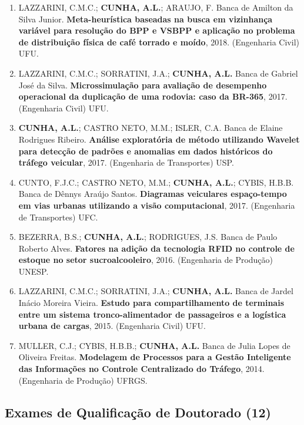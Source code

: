 \documentclass[
  brazilian,
  11pt,
  a4paper,
]{article}
\begin{document}
\begin{enumerate}
  Mariana Marçal Thebit. \textbf{Reconstrução de matriz O/D sintética a
  partir de dados de tráfego disponíveis na web}, 2018. (Engenharia de
  Transportes) USP.
\item
  LAZZARINI, C.M.C.; \textbf{CUNHA, A.L.}; ARAUJO, F. Banca de Amilton
  da Silva Junior. \textbf{Meta-heurística baseadas na busca em
  vizinhança variável para resolução do BPP e VSBPP e aplicação no
  problema de distribuição física de café torrado e moído}, 2018.
  (Engenharia Civil) UFU.
\item
  LAZZARINI, C.M.C.; SORRATINI, J.A.; \textbf{CUNHA, A.L.} Banca de
  Gabriel José da Silva. \textbf{Microssimulação para avaliação de
  desempenho operacional da duplicação de uma rodovia: caso da BR-365},
  2017. (Engenharia Civil) UFU.
\item
  \textbf{CUNHA, A.L.}; CASTRO NETO, M.M.; ISLER, C.A. Banca de Elaine
  Rodrigues Ribeiro. \textbf{Análise exploratória de método utilizando
  Wavelet para detecção de padrões e anomalias em dados históricos do
  tráfego veicular}, 2017. (Engenharia de Transportes) USP.
\item
  CUNTO, F.J.C.; CASTRO NETO, M.M.; \textbf{CUNHA, A.L.}; CYBIS, H.B.B.
  Banca de Dênnys Araújo Santos. \textbf{Diagramas veiculares
  espaço-tempo em vias urbanas utilizando a visão computacional}, 2017.
  (Engenharia de Transportes) UFC.
\item
  BEZERRA, B.S.; \textbf{CUNHA, A.L.}; RODRIGUES, J.S. Banca de Paulo
  Roberto Alves. \textbf{Fatores na adição da tecnologia RFID no
  controle de estoque no setor sucroalcooleiro}, 2016. (Engenharia de
  Produção) UNESP.
\item
  LAZZARINI, C.M.C.; SORRATINI, J.A.; \textbf{CUNHA, A.L.} Banca de
  Jardel Inácio Moreira Vieira. \textbf{Estudo para compartilhamento de
  terminais entre um sistema tronco-alimentador de passageiros e a
  logística urbana de cargas}, 2015. (Engenharia Civil) UFU.
\item
  MULLER, C.J.; CYBIS, H.B.B.; \textbf{CUNHA, A.L.} Banca de Julia Lopes
  de Oliveira Freitas. \textbf{Modelagem de Processos para a Gestão
  Inteligente das Informações no Controle Centralizado do Tráfego},
  2014. (Engenharia de Produção) UFRGS.
\end{enumerate}

\subsection{Exames de Qualificação de Doutorado
(12)}\label{exames-de-qualificauxe7uxe3o-de-doutorado-12}
\end{document}
